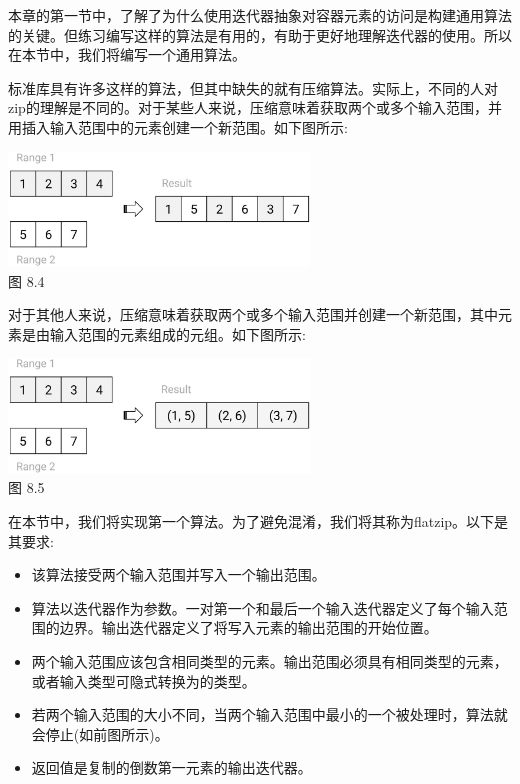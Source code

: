 
本章的第一节中，了解了为什么使用迭代器抽象对容器元素的访问是构建通用算法的关键。但练习编写这样的算法是有用的，有助于更好地理解迭代器的使用。所以在本节中，我们将编写一个通用算法。

标准库具有许多这样的算法，但其中缺失的就有压缩算法。实际上，不同的人对zip的理解是不同的。对于某些人来说，压缩意味着获取两个或多个输入范围，并用插入输入范围中的元素创建一个新范围。如下图所示:

\begin{center}
\includegraphics[width=0.6\textwidth]{content/3/chapter8/images/4.png}\\
图 8.4
\end{center}

对于其他人来说，压缩意味着获取两个或多个输入范围并创建一个新范围，其中元素是由输入范围的元素组成的元组。如下图所示:

\begin{center}
\includegraphics[width=0.6\textwidth]{content/3/chapter8/images/5.png}\\
图 8.5
\end{center}

在本节中，我们将实现第一个算法。为了避免混淆，我们将其称为flatzip。以下是其要求:

\begin{itemize}
\item
该算法接受两个输入范围并写入一个输出范围。

\item
算法以迭代器作为参数。一对第一个和最后一个输入迭代器定义了每个输入范围的边界。输出迭代器定义了将写入元素的输出范围的开始位置。

\item
两个输入范围应该包含相同类型的元素。输出范围必须具有相同类型的元素，或者输入类型可隐式转换为的类型。

\item
若两个输入范围的大小不同，当两个输入范围中最小的一个被处理时，算法就会停止(如前图所示)。

\item
返回值是复制的倒数第一元素的输出迭代器。
\end{itemize}

